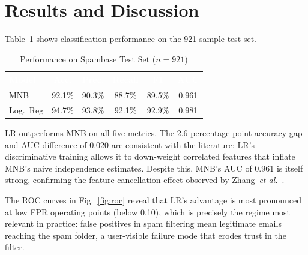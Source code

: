 \documentclass[conference,letterpaper]{IEEEtran}
\begin{document}
\section{Results and Discussion}
\label{sec:results}

Table~\ref{tab:perf} shows classification performance on the 921-sample test set.

\begin{table}[!t]
\caption{Performance on Spambase Test Set ($n=921$)}
\label{tab:perf}
\centering
\renewcommand{\arraystretch}{1.3}
\setlength{\tabcolsep}{4pt}
\begin{tabular}{lccccc}
\toprule
\rowcolor{DkGreen}
\textcolor{white}{\small\textbf{Model}} &
\textcolor{white}{\small\textbf{Acc.}} &
\textcolor{white}{\small\textbf{Prec.}} &
\textcolor{white}{\small\textbf{Recall}} &
\textcolor{white}{\small\textbf{F1}} &
\textcolor{white}{\small\textbf{AUC}} \\
\midrule
\rowcolor{LightGreen}MNB      & 92.1\% & 90.3\% & 88.7\% & 89.5\% & 0.961 \\
\rowcolor{PaleGreen}Log.\ Reg & 94.7\% & 93.8\% & 92.1\% & 92.9\% & 0.981 \\
\bottomrule
\end{tabular}
\end{table}

LR outperforms MNB on all five metrics. The 2.6 percentage point accuracy gap and AUC difference
of 0.020 are consistent with the literature: LR's discriminative training allows it to down-weight
correlated features that inflate MNB's naive independence estimates. Despite this, MNB's AUC of
0.961 is itself strong, confirming the feature cancellation effect observed by
Zhang~\textit{et al.}~\cite{zhang2004}.

The ROC curves in Fig.~\ref{fig:roc} reveal that LR's advantage is most pronounced at low FPR
operating points (below 0.10), which is precisely the regime most relevant in practice: false
positives in spam filtering mean legitimate emails reaching the spam folder, a user-visible failure
mode that erodes trust in the filter.
\end{document}
